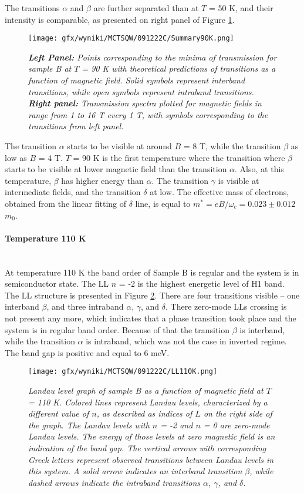 \documentclass[titlepage,a4paper]{book}
\newcommand{\wciecie}{\quad\phantom{v}}
\newcommand{\myparagraph}[1]{\paragraph{#1}\mbox{}\\}
\begin{document}
The transitions $\alpha$ and $\beta$ are further separated than at $T$ = 50 K, and their intensity is comparable, as presented on right panel of Figure \ref{fig:Summary_SQW_90K}.

\begin{figure}[ht]
	\centering
	\texttt{[image: gfx/wyniki/MCTSQW/091222C/Summary90K.png]}
	\vspace{-10pt}
	\caption{\textit{\textbf{Left Panel:} Points corresponding to the minima of transmission for sample B at $T$ = 90 K with theoretical predictions of transitions as a function of magnetic field. Solid symbols represent interband transitions, while open symbols represent intraband transitions. \textbf{Right panel:} Transmission spectra plotted for magnetic fields in range from 1 to 16 T every 1 T, with symbols corresponding to the transitions from left panel.}}
	\label{fig:Summary_SQW_90K}
\end{figure}
The transition $\alpha$ starts to be visible at around $B$ = 8 T, while the transition $\beta$ as low as $B$ = 4 T. $T$ = 90 K is the first temperature where the transition where $\beta$ starts to be visible at lower magnetic field than the transition $\alpha$. Also, at this temperature, $\beta$ has higher energy than $\alpha$. The transition $\gamma$ is visible at intermediate fields, and the transition $\delta$ at low. The effective mass of electrons, obtained from the linear fitting of $\delta$ line, is equal to $m^* = eB/\omega_c = 0.023 \pm 0.012$ $m_0$. 

\clearpage
\myparagraph{Temperature 110 K}
\wciecie
At temperature 110 K the band order of Sample B is regular and the system is in semiconductor state. The LL $n$ = -2 is the highest energetic level of H1 band. The LL structure is presented in Figure \ref{fig:LL_SQW_110K}. There are four transitions visible -- one interband $\beta$, and three intraband $\alpha$, $\gamma$, and $\delta$. There zero-mode LLs crossing is not present any more, which indicates that a phase transition took place and the system is in regular band order. Because of that the transition $\beta$ is interband, while the transition $\alpha$ is intraband, which was not the case in inverted regime. The band gap is positive and equal to 6 meV.

\begin{figure}[ht]
	\centering
	\texttt{[image: gfx/wyniki/MCTSQW/091222C/LL110K.png]}
	\vspace{-10pt}
	\caption{\textit{Landau level graph of sample B as a function of magnetic field at $T$ = 110 K. Colored lines represent Landau levels, characterized by a different value of $n$, as described as indices of $L$ on the right side of the graph. The Landau levels with $n$ = -2 and $n$ = 0 are zero-mode Landau levels. The energy of those levels at zero magnetic field is an indication of the band gap. The vertical arrows with corresponding Greek letters represent observed transitions between Landau levels in this system. A solid arrow indicates an interband transition $\beta$, while dashed arrows indicate the intraband transitions $\alpha$, $\gamma$, and $\delta$.}}
	\label{fig:LL_SQW_110K}
\end{figure}
\end{document}
